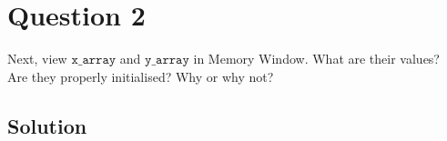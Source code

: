 \section*{Question 2}

Next, view \(\texttt{x\_array}\) and \(\texttt{y\_array}\) in Memory Window.
What are their values?\\
Are they properly initialised?
Why or why not?

\subsection*{Solution}
